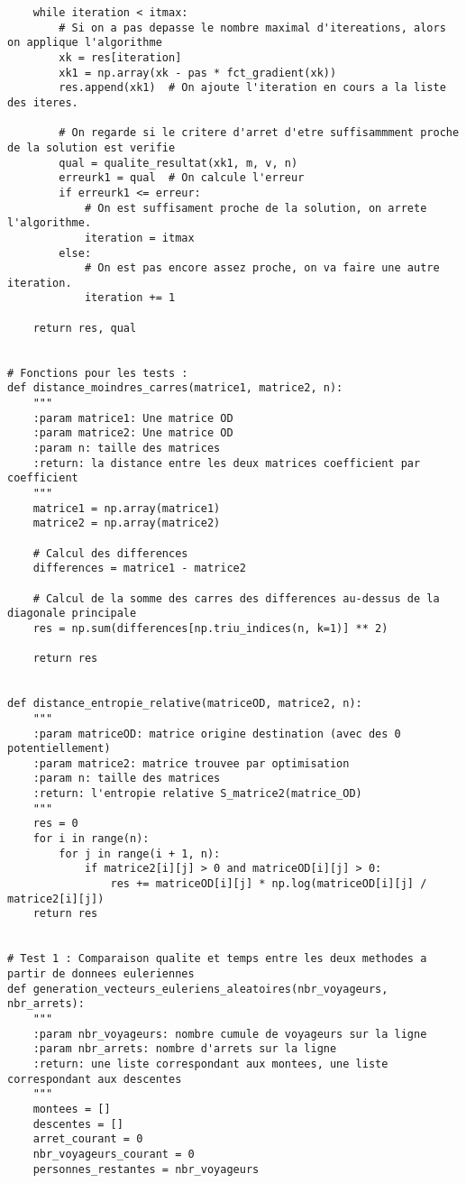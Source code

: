 \documentclass[12pt]{article}
\begin{document}
\begin{lstlisting}
    while iteration < itmax:
        # Si on a pas depasse le nombre maximal d'itereations, alors on applique l'algorithme
        xk = res[iteration]
        xk1 = np.array(xk - pas * fct_gradient(xk))
        res.append(xk1)  # On ajoute l'iteration en cours a la liste des iteres.

        # On regarde si le critere d'arret d'etre suffisammment proche de la solution est verifie
        qual = qualite_resultat(xk1, m, v, n)
        erreurk1 = qual  # On calcule l'erreur
        if erreurk1 <= erreur:
            # On est suffisament proche de la solution, on arrete l'algorithme.
            iteration = itmax
        else:
            # On est pas encore assez proche, on va faire une autre iteration.
            iteration += 1

    return res, qual


# Fonctions pour les tests :
def distance_moindres_carres(matrice1, matrice2, n):
    """
    :param matrice1: Une matrice OD
    :param matrice2: Une matrice OD
    :param n: taille des matrices
    :return: la distance entre les deux matrices coefficient par coefficient
    """
    matrice1 = np.array(matrice1)
    matrice2 = np.array(matrice2)

    # Calcul des differences
    differences = matrice1 - matrice2

    # Calcul de la somme des carres des differences au-dessus de la diagonale principale
    res = np.sum(differences[np.triu_indices(n, k=1)] ** 2)

    return res


def distance_entropie_relative(matriceOD, matrice2, n):
    """
    :param matriceOD: matrice origine destination (avec des 0 potentiellement)
    :param matrice2: matrice trouvee par optimisation
    :param n: taille des matrices
    :return: l'entropie relative S_matrice2(matrice_OD)
    """
    res = 0
    for i in range(n):
        for j in range(i + 1, n):
            if matrice2[i][j] > 0 and matriceOD[i][j] > 0:
                res += matriceOD[i][j] * np.log(matriceOD[i][j] / matrice2[i][j])
    return res


# Test 1 : Comparaison qualite et temps entre les deux methodes a partir de donnees euleriennes
def generation_vecteurs_euleriens_aleatoires(nbr_voyageurs, nbr_arrets):
    """
    :param nbr_voyageurs: nombre cumule de voyageurs sur la ligne
    :param nbr_arrets: nombre d'arrets sur la ligne
    :return: une liste correspondant aux montees, une liste correspondant aux descentes
    """
    montees = []
    descentes = []
    arret_courant = 0
    nbr_voyageurs_courant = 0
    personnes_restantes = nbr_voyageurs


\end{lstlisting}
\end{document}
